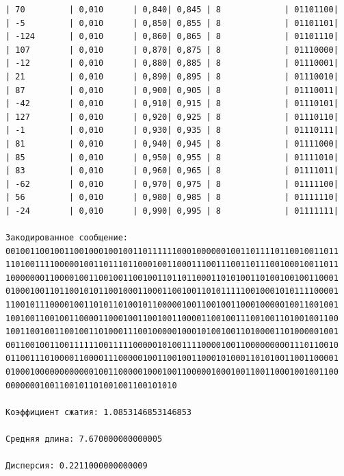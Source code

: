 \documentclass[a4paper,14pt]{extarticle}
\begin{document}
\begin{enumerate}
\begin{verbatim}
| 70         | 0,010      | 0,840| 0,845 | 8             | 01101100|
| -5         | 0,010      | 0,850| 0,855 | 8             | 01101101|
| -124       | 0,010      | 0,860| 0,865 | 8             | 01101110|
| 107        | 0,010      | 0,870| 0,875 | 8             | 01110000|
| -12        | 0,010      | 0,880| 0,885 | 8             | 01110001|
| 21         | 0,010      | 0,890| 0,895 | 8             | 01110010|
| 87         | 0,010      | 0,900| 0,905 | 8             | 01110011|
| -42        | 0,010      | 0,910| 0,915 | 8             | 01110101|
| 127        | 0,010      | 0,920| 0,925 | 8             | 01110110|
| -1         | 0,010      | 0,930| 0,935 | 8             | 01110111|
| 81         | 0,010      | 0,940| 0,945 | 8             | 01111000|
| 85         | 0,010      | 0,950| 0,955 | 8             | 01111010|
| 83         | 0,010      | 0,960| 0,965 | 8             | 01111011|
| -62        | 0,010      | 0,970| 0,975 | 8             | 01111100|
| 56         | 0,010      | 0,980| 0,985 | 8             | 01111110|
| -24        | 0,010      | 0,990| 0,995 | 8             | 01111111|

Закодированное сообщение: 
00100110010011001000100100110111111000100000010011011110110010011011
11010011110000010011011101100010011000111001110011011100100010011011
10000000110000100110010011001001101101100011010100110100100100110001
01000100110110010101100100011000110010011010111110010001010111100001
11001011100001001101011010010110000010011001001100010000010011001001
10010011001001100001100010011001001100001100100111001001101001001100
10011001001100100110100011100100000100010100100110100001101000001001
00110010011001111110011111000001010011110000100110000000001110110010
01100111010000110000111000001001100100110001010001101010011001100001
01000100000000000010011000001000100110000010001001100110001001001100
00000001001100101101001001100101010

Коэффициент сжатия: 1.0853146853146853

Средняя длина: 7.670000000000005

Дисперсия: 0.2211000000000009
\end{verbatim}


\end{enumerate}
\end{document}
